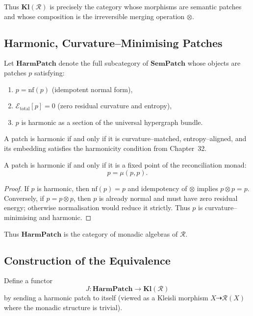 Thus $\mathbf{Kl}(\mathcal{R})$ is precisely the category whose morphisms
are semantic patches and whose composition is the irreversible merging
operation $\otimes$.

\subsection{Harmonic, Curvature–Minimising Patches}
\label{subsec:79-6-harmonic}

Let $\mathbf{HarmPatch}$ denote the full subcategory of $\mathbf{SemPatch}$
whose objects are patches $p$ satisfying:

\begin{enumerate}
\item[\textbf{(H1)}] $p = \mathrm{nf}(p)$ (idempotent normal form),
\item[\textbf{(H2)}] $\mathcal{E}_{\mathrm{total}}[p] = 0$
  (zero residual curvature and entropy),
\item[\textbf{(H3)}] $p$ is harmonic as a section of the universal
  hypergraph bundle.
\end{enumerate}

A patch is harmonic if and only if it is curvature–matched, entropy–aligned,
and its embedding satisfies the harmonicity condition from Chapter~32.

\begin{lemma}
A patch is harmonic if and only if it is a fixed point of the
reconciliation monad:
\[
p = \mu(p,p).
\]
\end{lemma}

\begin{proof}
If $p$ is harmonic, then $\mathrm{nf}(p)=p$ and idempotency of $\otimes$
implies $p\otimes p = p$.  
Conversely, if $p = p\otimes p$, then $p$ is already normal and must have
zero residual energy; otherwise normalisation would reduce it strictly.
Thus $p$ is curvature–minimising and harmonic.
\end{proof}

Thus $\mathbf{HarmPatch}$ is the category of monadic algebras of $\mathcal{R}$.

\subsection{Construction of the Equivalence}
\label{subsec:79-6-equivalence}

Define a functor
\[
J : \mathbf{HarmPatch} \longrightarrow \mathbf{Kl}(\mathcal{R})
\]
by sending a harmonic patch to itself (viewed as a Kleisli morphism
$X \dasharrow \mathcal{R}(X)$ where the monadic structure is trivial).

